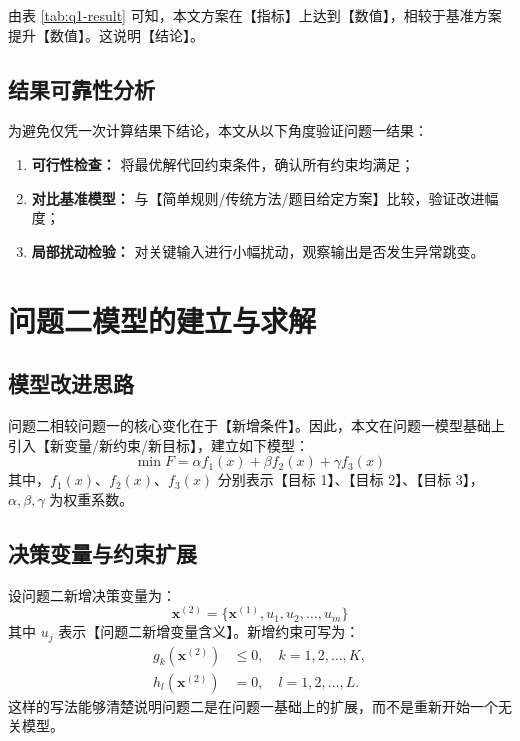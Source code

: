 \documentclass{cumcmthesis}
\begin{document}
由表 \ref{tab:q1-result} 可知，本文方案在【指标】上达到【数值】，相较于基准方案提升【数值】。这说明【结论】。

\subsection{结果可靠性分析}
为避免仅凭一次计算结果下结论，本文从以下角度验证问题一结果：
\begin{enumerate}
  \item \textbf{可行性检查：} 将最优解代回约束条件，确认所有约束均满足；
  \item \textbf{对比基准模型：} 与【简单规则/传统方法/题目给定方案】比较，验证改进幅度；
  \item \textbf{局部扰动检验：} 对关键输入进行小幅扰动，观察输出是否发生异常跳变。
\end{enumerate}

\section{问题二模型的建立与求解}

\subsection{模型改进思路}
问题二相较问题一的核心变化在于【新增条件】。因此，本文在问题一模型基础上引入【新变量/新约束/新目标】，建立如下模型：
\begin{equation}
  \min F = \alpha f_1(x) + \beta f_2(x) + \gamma f_3(x)
  \label{eq:q2-obj}
\end{equation}
其中，$f_1(x)$、$f_2(x)$、$f_3(x)$ 分别表示【目标 1】、【目标 2】、【目标 3】，$\alpha,\beta,\gamma$ 为权重系数。

\subsection{决策变量与约束扩展}
设问题二新增决策变量为：
\begin{equation}
  \mathbf{x}^{(2)} = \{\mathbf{x}^{(1)}, u_1,u_2,\ldots,u_m\}
  \label{eq:q2-vars}
\end{equation}
其中 $u_j$ 表示【问题二新增变量含义】。新增约束可写为：
\begin{align}
  g_k(\mathbf{x}^{(2)}) &\le 0,\quad k=1,2,\ldots,K, \\
  h_l(\mathbf{x}^{(2)}) &= 0,\quad l=1,2,\ldots,L.
\end{align}
这样的写法能够清楚说明问题二是在问题一基础上的扩展，而不是重新开始一个无关模型。
\end{document}
